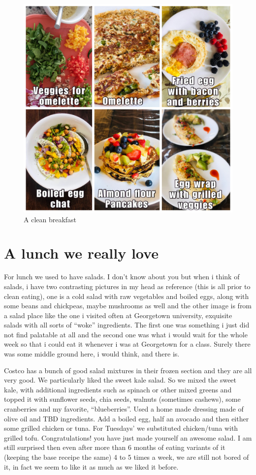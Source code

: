 \documentclass[oneside]{book}
\begin{document}
\begin{figure}
\centering
\includegraphics{pictures/breakfast.JPG}
\caption{A clean breakfast}
\end{figure}

\section{A lunch we really love}\label{a-lunch-we-really-love}

For lunch we used to have salads. I don't know about you but when i
think of salads, i have two contrasting pictures in my head as reference
(this is all prior to clean eating), one is a cold salad with raw
vegetables and boiled eggs, along with some beans and chickpeas, maybe
mushrooms as well and the other image is from a salad place like the one
i visited often at Georgetown university, exquisite salads with all
sorts of ``woke'' ingredients. The first one was something i just did
not find palatable at all and the second one was what i would wait for
the whole week so that i could eat it whenever i was at Georgetown for a
class. Surely there was some middle ground here, i would think, and
there is.

Costco has a bunch of good salad mixtures in their frozen section and
they are all very good. We particularly liked the sweet kale salad. So
we mixed the sweet kale, with additional ingredients such as spinach or
other mixed greens and topped it with sunflower seeds, chia seeds,
walnuts (sometimes cashews), some cranberries and my favorite,
``blueberries''. Used a home made dressing made of olive oil and TBD
ingredients. Add a boiled egg, half an avocado and then either some
grilled chicken or tuna. For Tuesdays' we substituted chicken/tuna with
grilled tofu. Congratulations! you have just made yourself an awesome
salad. I am still surprised then even after more than 6 months of eating
variants of it (keeping the base receipe the same) 4 to 5 times a week,
we are still not bored of it, in fact we seem to like it as much as we
liked it before.
\end{document}
